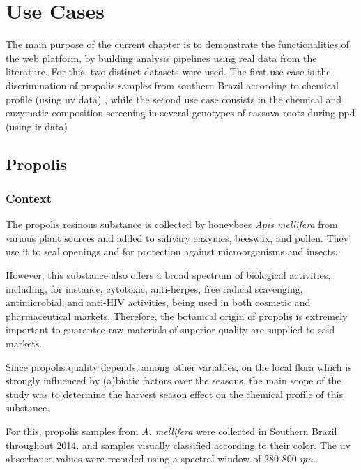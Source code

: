 
\chapter{Use Cases} \label{use_cases}

The main purpose of the current chapter is to demonstrate the functionalities of the web platform, by building analysis pipelines using real data from the literature. For this, two distinct datasets were used. The first use case is the discrimination of propolis samples from southern Brazil according to chemical profile (using \gls{uv} data) \citep{tomazzoli2015discrimination}, while the second use case consists in the chemical and enzymatic composition screening in several genotypes of cassava roots during \gls{ppd} (using \gls{ir} data) \citep{uarrota2014metabolomics}.


\section{Propolis}

\subsection{Context}

The propolis resinous substance is collected by honeybees \textit{Apis mellifera} from various plant sources and added to salivary enzymes, beeswax, and pollen. They use it to seal openings and for protection against microorganisms and insects.

However, this substance also offers a broad spectrum of biological activities, including, for instance, cytotoxic, anti-herpes, free radical scavenging, antimicrobial, and anti-HIV activities, being used in both cosmetic and pharmaceutical markets. Therefore, the botanical origin of propolis is extremely important to guarantee raw materials of superior quality are supplied to said markets.

Since propolis quality depends, among other variables, on the local flora
which is strongly influenced by (a)biotic factors over the seasons, the main scope of the study was to determine the harvest season effect on the chemical profile of this substance.

For this, propolis samples from \textit{A. mellifera} were collected in Southern Brazil throughout 2014, and samples visually classified according to their color. The \gls{uv} absorbance values were recorded using a spectral window of 280-800 $\eta m$.


